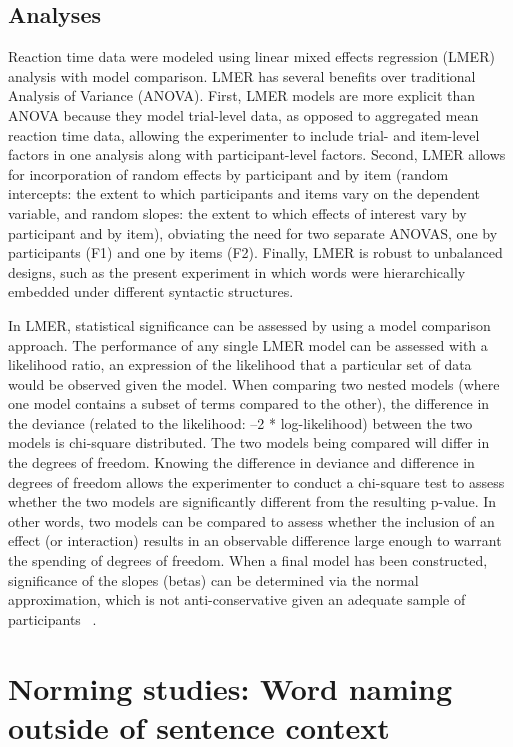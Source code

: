 \section{Analyses}
\label{analyses}

Reaction time data were modeled using linear mixed effects regression (LMER) analysis with model comparison. LMER has several benefits over traditional Analysis of Variance (ANOVA). First, LMER models are more explicit than ANOVA because they model trial-level data, as opposed to aggregated mean reaction time data, allowing the experimenter to include trial- and item-level factors in one analysis along with participant-level factors. Second, LMER allows for incorporation of random effects by participant and by item (random intercepts: the extent to which participants and items vary on the dependent variable, and random slopes: the extent to which effects of interest vary by participant and by item), obviating the need for two separate ANOVAS, one by participants (F1) and one by items (F2). Finally, LMER is robust to unbalanced designs, such as the present experiment in which words were hierarchically embedded under different syntactic structures. 

In LMER, statistical significance can be assessed by using a model comparison approach. The performance of any single LMER model can be assessed with a likelihood ratio, an expression of the likelihood that a particular set of data would be observed given the model. When comparing two nested models (where one model contains a subset of terms compared to the other), the difference in the deviance (related to the likelihood: --2 * log-likelihood) between the two models is chi-square distributed. The two models being compared will differ in the degrees of freedom. Knowing the difference in deviance and difference in degrees of freedom allows the experimenter to conduct a chi-square test to assess whether the two models are significantly different from the resulting p-value. In other words, two models can be compared to assess whether the inclusion of an effect (or interaction) results in an observable difference large enough to warrant the spending of degrees of freedom. When a final model has been constructed, significance of the slopes (betas) can be determined via the normal approximation, which is not anti-conservative given an adequate sample of participants ~\citep{Barr2013}. 

\chapter{Norming studies: Word naming outside of sentence context}
\label{normingstudies:wordnamingoutsideofsentencecontext}

